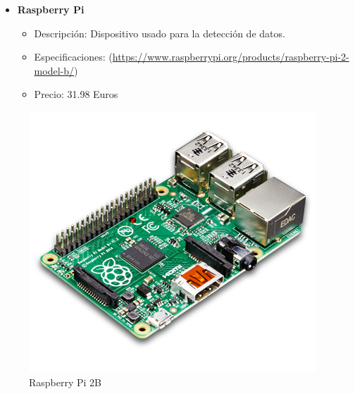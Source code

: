 {\begin{itemize}
 \item \textbf{Raspberry Pi}
 \begin{itemize}
  \item Descripción: Dispositivo usado para la detección de datos.
  \item Especificaciones:  (\url{https://www.raspberrypi.org/products/raspberry-pi-2-model-b/})
  \item Precio: 31.98 Euros
 \end{itemize}
\end{itemize}
\begin{figure}[!h]
  \begin{center}
    \includegraphics[scale=0.30]{../images/hardware/pi.png}
    \caption{Raspberry Pi 2B}
    \label{fig:rpi}
  \end{center}
\end{figure}

}

